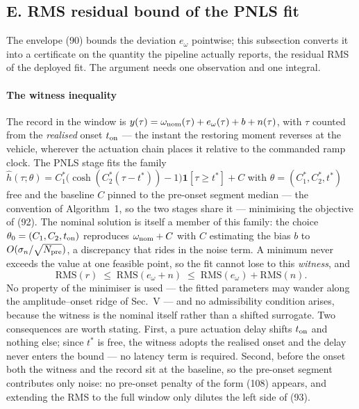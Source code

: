 \documentclass[10pt]{article}
\newcommand{\rms}{\mathrm{RMS}}
\begin{document}

\subsection*{E. RMS residual bound of the PNLS fit}

The envelope (90) bounds the deviation $e_\omega$ pointwise; this
subsection converts it into a certificate on the quantity the
pipeline actually reports, the residual RMS of the deployed fit. The
argument needs one observation and one integral.

\paragraph*{The witness inequality}
The record in the window is
$y(\tau) = \omega_{\rm nom}(\tau) + e_\omega(\tau) + b + n(\tau)$,
with $\tau$ counted from the \emph{realised} onset $t_{\rm on}$ ---
the instant the restoring moment reverses at the vehicle, wherever
the actuation chain places it relative to the commanded ramp clock.
The PNLS stage fits the family
$\hat h(\tau;\theta) = C_1^*\big(\cosh(C_2^*(\tau - t^*)) -
1\big)\mathbf 1[\tau \ge t^*] + C$ with
$\theta = (C_1^*, C_2^*, t^*)$ free and the baseline $C$ pinned to
the pre-onset segment median --- the convention of Algorithm~1, so
the two stages share it --- minimising the objective of (92). The
nominal solution is itself a member of this family: the choice
$\theta_0 = (C_1, C_2, t_{\rm on})$ reproduces
$\omega_{\rm nom} + C$ with $C$ estimating the bias $b$ to
$O(\sigma_n/\sqrt{N_{\rm pre}})$, a discrepancy that rides in the
noise term. A minimum never exceeds the value at one feasible
point, so the fit cannot lose to this \emph{witness}, and
\begin{equation}
  \rms(r) \;\le\; \rms(e_\omega + n)
  \;\le\; \rms(e_\omega) + \rms(n).
  \tag{93}
\end{equation}
No property of the minimiser is used --- the fitted parameters may
wander along the amplitude--onset ridge of Sec.~V --- and no
admissibility condition arises, because the witness is the nominal
itself rather than a shifted surrogate. Two consequences are worth
stating. First, a pure actuation delay shifts $t_{\rm on}$ and
nothing else; since $t^*$ is free, the witness adopts the realised
onset and the delay never enters the bound --- no latency term is
required. Second, before the onset both the witness and the record
sit at the baseline, so the pre-onset segment contributes only
noise: no pre-onset penalty of the form (108) appears, and
extending the RMS to the full window only dilutes the left side of
(93).
\end{document}
